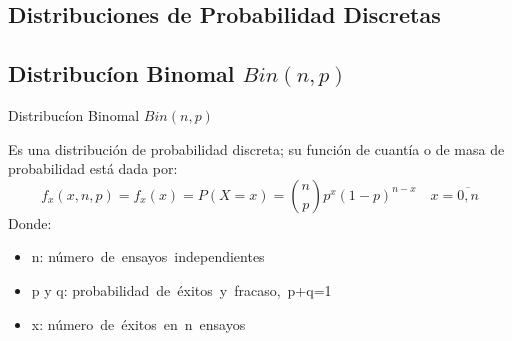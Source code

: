 \documentclass[
  ignorenonframetext,
]{beamer}
\begin{document}
\hypertarget{distribuciones-de-probabilidad-discretas}{%
\subsection{Distribuciones de Probabilidad
Discretas}\label{distribuciones-de-probabilidad-discretas}}

\hypertarget{distribucuxedon-binomal-binnp}{%
\subsection{\texorpdfstring{Distribucíon Binomal
\(Bin(n,p)\)}{Distribucíon Binomal Bin(n,p)}}\label{distribucuxedon-binomal-binnp}}

\begin{frame}{Distribucíon Binomal \(Bin(n,p)\)}

\justifying Es una distribución de probabilidad discreta; su función de
cuantía o de masa de probabilidad está dada por:
\[f_x{(x,n,p)}=f_x (x)=P(X=x)=\binom{n}{p}p^x (1-p)^{n-x} \quad x=\overline{0,n}\]
Donde:

\begin{itemize}
    \item n: \mbox{número de ensayos independientes}
    \item p y q: \mbox{probabilidad de éxitos y fracaso, p+q=1}
    \item x: \mbox{número de éxitos en n ensayos}
\end{itemize}

\end{frame}

\hypertarget{section-1}{%
\subsection{}\label{section-1}}
\end{document}
